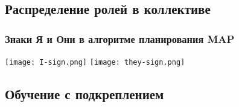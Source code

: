 	\subsection{Распределение ролей в коллективе}
	\begin{frame}
		\frametitle{Знаки Я и Они в алгоритме планирования MAP}
		
		\begin{center}
			\texttt{[image: I-sign.png]}
			\texttt{[image: they-sign.png]}
		\end{center}
		\nocite{*}
		\printbibliography[keyword={roledistrib}, resetnumbers=true]
	\end{frame}
	\subsection{Обучение с подкреплением}
